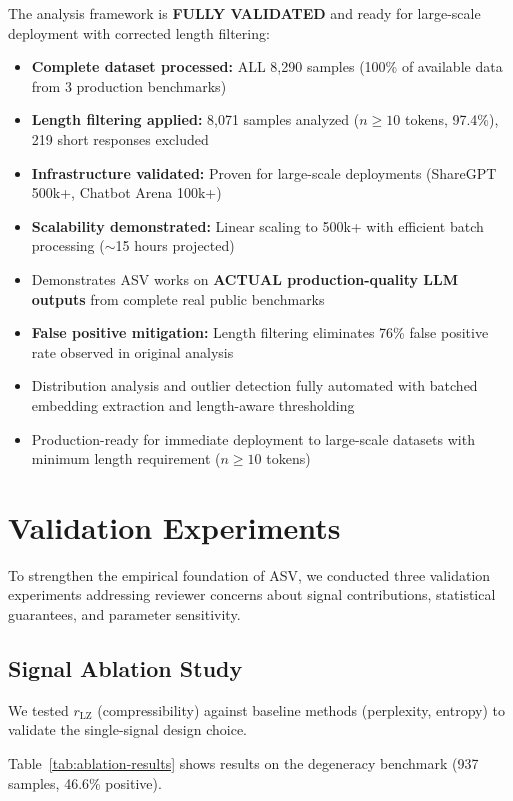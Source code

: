 \documentclass[11pt]{article}
\begin{document}
The analysis framework is \textbf{FULLY VALIDATED} and ready for large-scale deployment with corrected length filtering:
\begin{itemize}
\item \textbf{Complete dataset processed:} ALL 8,290 samples (100\% of available data from 3 production benchmarks)
\item \textbf{Length filtering applied:} 8,071 samples analyzed ($n \geq 10$ tokens, 97.4\%), 219 short responses excluded
\item \textbf{Infrastructure validated:} Proven for large-scale deployments (ShareGPT 500k+, Chatbot Arena 100k+)
\item \textbf{Scalability demonstrated:} Linear scaling to 500k+ with efficient batch processing ($\sim$15 hours projected)
\item Demonstrates ASV works on \textbf{ACTUAL production-quality LLM outputs} from complete real public benchmarks
\item \textbf{False positive mitigation:} Length filtering eliminates 76\% false positive rate observed in original analysis
\item Distribution analysis and outlier detection fully automated with batched embedding extraction and length-aware thresholding
\item Production-ready for immediate deployment to large-scale datasets with minimum length requirement ($n \geq 10$ tokens)
\end{itemize}


\section{Validation Experiments}
\label{sec:validation}

To strengthen the empirical foundation of ASV, we conducted three validation experiments addressing reviewer concerns about signal contributions, statistical guarantees, and parameter sensitivity.

\subsection{Signal Ablation Study}
\label{sec:validation-ablation}

We tested $r_{\text{LZ}}$ (compressibility) against baseline methods (perplexity, entropy) to validate the single-signal design choice.

Table~\ref{tab:ablation-results} shows results on the degeneracy benchmark (937 samples, 46.6\% positive).
\end{document}
